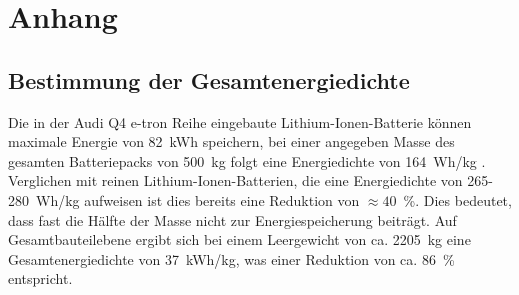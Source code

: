 \chapter{\label{ch:anhang} Anhang}

\section{\label{ch:AudiEnergie}Bestimmung der Gesamtenergiedichte}

Die in der Audi Q4 e-tron Reihe eingebaute Lithium-Ionen-Batterie können maximale Energie von 82~kWh speichern, bei einer angegeben Masse des gesamten Batteriepacks von 500~kg folgt eine Energiedichte von 164~Wh/kg \cite{Radu2021,Audi2022}. Verglichen mit reinen Lithium-Ionen-Batterien, die eine Energiedichte von 265-280~Wh/kg \cite{Armand2020} aufweisen ist dies bereits eine Reduktion von $\approx 40$~\%. Dies bedeutet, dass fast die Hälfte der Masse nicht zur Energiespeicherung beiträgt. Auf Gesamtbauteilebene ergibt sich bei einem Leergewicht von ca. 2205~kg \cite{Audi2022} eine Gesamtenergiedichte von 37~kWh/kg, was einer Reduktion von ca. 86~\% entspricht.


